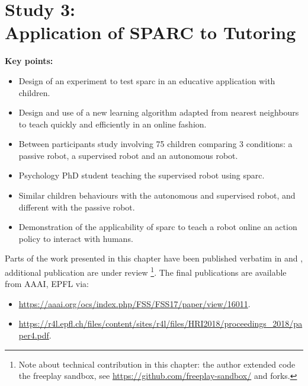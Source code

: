 \chapter[Study 3: Application of SPARC to Tutoring]{Study 3: \\Application of SPARC to Tutoring}\label{chap:tutoring}
\glsresetall
\graphicspath{{images/tutoring/}}

\begin{framed}
	\textbf{Key points:}
	
	\begin{itemize}
		\item Design of an experiment to test \acrshort{sparc} in an educative application with children.
		\item Design and use of a new learning algorithm adapted from nearest neighbours to teach quickly and efficiently in an online fashion.
		\item Between participants study involving 75 children comparing 3 conditions: a passive robot, a supervised robot and an autonomous robot.
		\item Psychology PhD student teaching the supervised robot using \acrshort{sparc}.
		\item Similar children behaviours with the autonomous and supervised robot, and different with the passive robot.
		\item Demonstration of the applicability of \acrshort{sparc} to teach a robot online an action policy to interact with humans.
	\end{itemize}
\end{framed}

Parts of the work presented in this chapter have been published verbatim in \cite{senft2017toward} and \cite{senft2018robots}, additional publication are under review \footnote{Note about technical contribution in this chapter: the author extended code the freeplay sandbox, see \url{https://github.com/freeplay-sandbox/} and forks.}. The final publications are available from AAAI, EPFL via:
\begin{itemize}
	\item \url{https://aaai.org/ocs/index.php/FSS/FSS17/paper/view/16011}.
	\item \url{https://r4l.epfl.ch/files/content/sites/r4l/files/HRI2018/proceedings_2018/paper4.pdf}.
\end{itemize} 

\newpage

